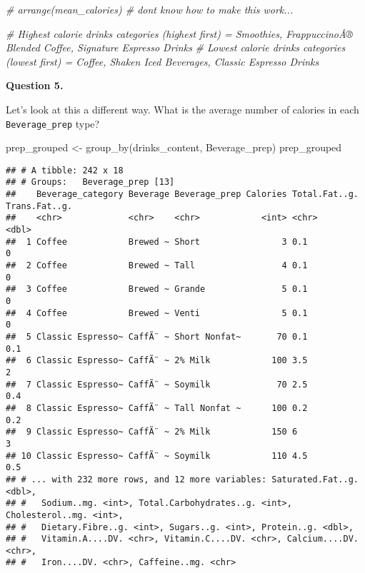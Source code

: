 \documentclass[
]{article}
\newenvironment{Shaded}{\begin{snugshade}}{\end{snugshade}}
\newcommand{\CommentTok}[1]{\textcolor[rgb]{0.56,0.35,0.01}{\textit{#1}}}
\newcommand{\FunctionTok}[1]{\textcolor[rgb]{0.00,0.00,0.00}{#1}}
\newcommand{\NormalTok}[1]{#1}
\newcommand{\OtherTok}[1]{\textcolor[rgb]{0.56,0.35,0.01}{#1}}
\begin{document}
\begin{Shaded}
\begin{Highlighting}[]
\CommentTok{\# arrange(mean\_calories) \# don\textquotesingle{}t know how to make this work... }

\CommentTok{\# Highest calorie drinks categories (highest first) = Smoothies, FrappuccinoÂ® Blended Coffee, Signature Espresso Drinks}
\CommentTok{\# Lowest calorie drinks categories (lowest first) = Coffee, Shaken Iced Beverages, Classic Espresso Drinks}
\end{Highlighting}
\end{Shaded}

\textbf{Question 5.}

Let's look at this a different way. What is the average number of
calories in each \texttt{Beverage\_prep} type?

\begin{Shaded}
\begin{Highlighting}[]
\NormalTok{prep\_grouped }\OtherTok{\textless{}{-}} \FunctionTok{group\_by}\NormalTok{(drinks\_content, Beverage\_prep)}
\NormalTok{prep\_grouped}
\end{Highlighting}
\end{Shaded}

\begin{verbatim}
## # A tibble: 242 x 18
## # Groups:   Beverage_prep [13]
##    Beverage_category Beverage Beverage_prep Calories Total.Fat..g. Trans.Fat..g.
##    <chr>             <chr>    <chr>            <int> <chr>                 <dbl>
##  1 Coffee            Brewed ~ Short                3 0.1                     0  
##  2 Coffee            Brewed ~ Tall                 4 0.1                     0  
##  3 Coffee            Brewed ~ Grande               5 0.1                     0  
##  4 Coffee            Brewed ~ Venti                5 0.1                     0  
##  5 Classic Espresso~ CaffÃ¨ ~ Short Nonfat~       70 0.1                     0.1
##  6 Classic Espresso~ CaffÃ¨ ~ 2% Milk            100 3.5                     2  
##  7 Classic Espresso~ CaffÃ¨ ~ Soymilk             70 2.5                     0.4
##  8 Classic Espresso~ CaffÃ¨ ~ Tall Nonfat ~      100 0.2                     0.2
##  9 Classic Espresso~ CaffÃ¨ ~ 2% Milk            150 6                       3  
## 10 Classic Espresso~ CaffÃ¨ ~ Soymilk            110 4.5                     0.5
## # ... with 232 more rows, and 12 more variables: Saturated.Fat..g. <dbl>,
## #   Sodium..mg. <int>, Total.Carbohydrates..g. <int>, Cholesterol..mg. <int>,
## #   Dietary.Fibre..g. <int>, Sugars..g. <int>, Protein..g. <dbl>,
## #   Vitamin.A....DV. <chr>, Vitamin.C....DV. <chr>, Calcium....DV. <chr>,
## #   Iron....DV. <chr>, Caffeine..mg. <chr>
\end{verbatim}
\end{document}
